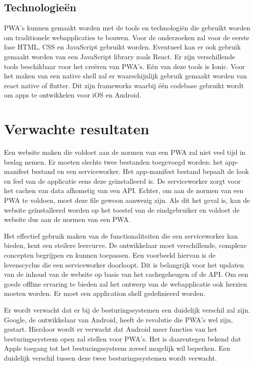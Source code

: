 \subsection{Technologieën}

PWA's kunnen gemaakt worden met de tools en technologiën die gebruikt worden om traditionele webapplicaties te bouwen. 
Voor de onderzoeken zal voor de eerste fase HTML, CSS en JavaScript gebruikt worden. Eventueel kan er ook gebruik gemaakt worden van een JavaScript library zoals React.
Er zijn verschillende tools beschikbaar voor het creëren van PWA's. Eén van deze tools is Ionic.
Voor het maken van een native shell zal er waarschijnlijk gebruik gemaakt worden van react native of flutter. Dit zijn frameworks waarbij één codebase gebruikt wordt om apps te ontwikkelen voor iOS en Android.




\section{Verwachte resultaten}
\label{sec:verwachte_resultaten}


Een website maken die voldoet aan de normen van een PWA zal niet veel tijd in beslag nemen. Er moeten slechts twee bestanden toegevoegd worden: het app-manifest bestand en een serviceworker. Het app-manifest bestand bepaalt de look en feel van de applicatie eens deze geïnstalleerd is. 
De serviceworker zorgt voor het cachen van data afkomstig van een API. Echter, om aan de normen van een PWA te voldoen, moet deze file gewoon aanwezig zijn. 
Als dit het geval is, kan de website geïnstalleerd worden op het toestel van de eindgebruiker en voldoet de website dus aan de normen van een PWA.

Het effectief gebruik maken van de functionaliteiten die een serviceworker kan bieden, kent een steilere leercurve. De ontwikkelaar moet verschillende, complexe concepten begrijpen en kunnen toepassen. 
Een voorbeeld hiervan is de levenscyclus die een serviceworker doorloopt. Dit is belangrijk voor het updaten van de inhoud van de website op basis van het cachegeheugen of de API. 
Om een goede offline ervaring te bieden zal het ontwerp van de webapplicatie ook herzien moeten worden. Er moet een application shell gedefinieerd worden.
\autocite{Gaunt2019} \autocite{Osmani2016}

Er wordt verwacht dat er bij de besturingssystemen een duidelijk verschil zal zijn. 
Google, de ontwikkelaar van Android, heeft de revolutie die PWA's wel zijn, gestart.
Hierdoor wordt er verwacht dat Android meer functies van het besturingssysteem open zal stellen voor PWA's.
Het is daarentegen bekend dat Apple toegang tot het besturingssysteem zoveel mogelijk wil beperken. Een duidelijk verschil tussen deze twee besturingssystemen wordt verwacht. 
\autocite{Hansen2017}




